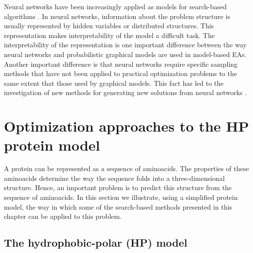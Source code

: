  Neural networks have been increasingly applied as models for search-based algorithms \cite{Baluja:2017,Probst_and_Rothlauf:2015}.  In neural networks, information about the problem structure is usually represented by hidden variables or distributed structures. This representation makes interpretability of the model a difficult task. The interpretability of the representation is one important  difference between the way neural networks and probabilistic  graphical models are used in model-based EAs. Another important difference is that neural networks require specific sampling methods that have not been applied to practical optimization problems to the same extent that those used by graphical models. This fact has led to the investigation of new methods for generating new solutions from neural networks \cite{Garciarena_et_al:2020b,Garciarena_et_al:2022}.



\section{Optimization approaches to the HP protein model} \label{sec:HPMODEL}

 A protein can be represented as a sequence of aminoacids. The properties of these aminoacids determine the way the sequence folds into a three-dimensional structure. Hence, an important problem is to predict this structure from the sequence of aminoacids. In this section we illustrate, using a simplified protein model, the way in which some of the search-based methods presented in this chapter can be applied to this problem. 

 \subsection{The hydrophobic-polar (HP) model}

